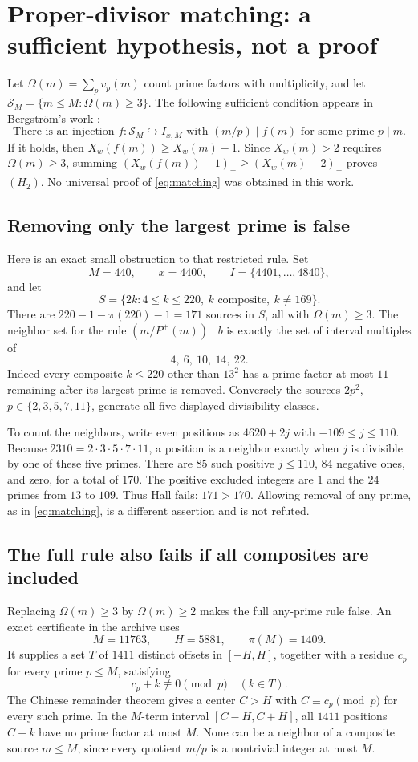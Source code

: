 \documentclass[11pt,a4paper]{article}
\theoremstyle{remark}
\newcommand{\pos}[1]{\left(#1\right)_+}
\newcommand{\II}{I_{x,M}}
\begin{document}
\section{Proper-divisor matching: a sufficient hypothesis, not a proof}
Let $\Omega(m)=\sum_p v_p(m)$ count prime factors with multiplicity, and
let $\mathcal S_M=\{m\le M:\Omega(m)\ge3\}$. The following sufficient
condition appears in Bergstr\"om's work \cite{berg-asym,berg-hinge}:
\begin{equation}\label{eq:matching}
 \text{There is an injection }f:\mathcal S_M\hookrightarrow\II
 \text{ with }(m/p)\mid f(m)\text{ for some prime }p\mid m.
\end{equation}
If it holds, then $X_w(f(m))\ge X_w(m)-1$. Since $X_w(m)>2$ requires
$\Omega(m)\ge3$, summing
$\pos{X_w(f(m))-1}\ge\pos{X_w(m)-2}$ proves $(H_2)$.
No universal proof of \eqref{eq:matching} was obtained in this work.

\subsection{Removing only the largest prime is false}
Here is an exact small obstruction to that restricted rule. Set
\[
 M=440,\qquad x=4400,\qquad I=\{4401,\ldots,4840\},
\]
and let
\[
 S=\{2k:4\le k\le220,\ k\text{ composite},\ k\ne169\}.
\]
There are $220-1-\pi(220)-1=171$ sources in $S$, all with
$\Omega(m)\ge3$. The neighbor set for the rule
$(m/P^+(m))\mid b$ is exactly the set of interval multiples of
\[
 4,\ 6,\ 10,\ 14,\ 22.
\]
Indeed every composite $k\le220$ other than $13^2$ has a prime factor
at most $11$ remaining after its largest prime is removed. Conversely
the sources $2p^2$, $p\in\{2,3,5,7,11\}$, generate all five displayed
divisibility classes.

To count the neighbors, write even positions as $4620+2j$ with
$-109\le j\le110$. Because $2310=2\cdot3\cdot5\cdot7\cdot11$,
a position is a neighbor exactly when $j$ is divisible by one of these
five primes. There are $85$ such positive $j\le110$, $84$ negative
ones, and zero, for a total of $170$. The positive excluded integers
are $1$ and the $24$ primes from $13$ to $109$.
Thus Hall fails: $171>170$. Allowing removal of any prime, as in
\eqref{eq:matching}, is a different assertion and is not refuted.

\subsection{The full rule also fails if all composites are included}
Replacing $\Omega(m)\ge3$ by $\Omega(m)\ge2$ makes the full any-prime
rule false. An exact certificate in the archive uses
\[
 M=11763,\qquad H=5881,\qquad \pi(M)=1409.
\]
It supplies a set $T$ of $1411$ distinct offsets in $[-H,H]$, together
with a residue $c_p$ for every prime $p\le M$, satisfying
\[
 c_p+k\not\equiv0\pmod p\quad(k\in T).
\]
The Chinese remainder theorem gives a center $C>H$ with
$C\equiv c_p\pmod p$ for every such prime. In the $M$-term interval
$[C-H,C+H]$, all $1411$ positions $C+k$ have no prime factor at most
$M$. None can be a neighbor of a composite source $m\le M$, since
every quotient $m/p$ is a nontrivial integer at most $M$.
\end{document}
